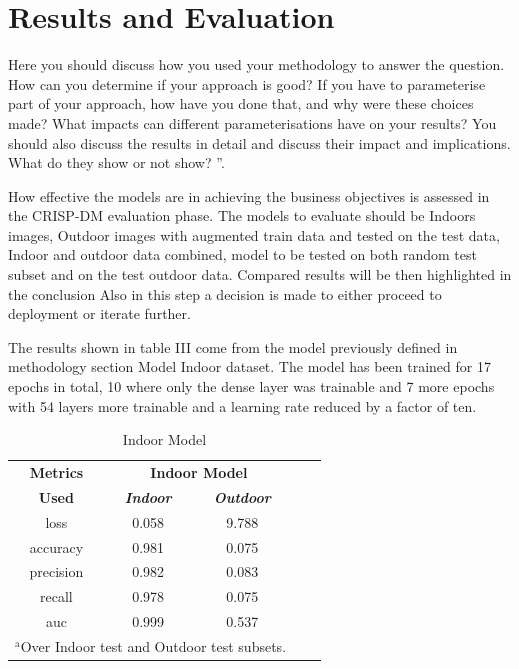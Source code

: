 \documentclass[conference]{IEEEtran}
\begin{document}
\section{Results and Evaluation}
Here you should discuss how you used your methodology to answer the question.  How can you determine if your approach is good?  If you have to parameterise part of your approach, how have you done that, and why were these choices made?  What impacts can different parameterisations have  on  your  results?   You  should  also  discuss  the  results  in  detail  and discuss their impact and implications.  What do they show or not show? ”. \

How effective the models are in achieving the business objectives is assessed in the CRISP-DM evaluation phase. The models to evaluate should be Indoors images, Outdoor images with augmented train data and tested on the test data, Indoor and outdoor data combined, model to be tested on both random test subset and on the test outdoor data. Compared results will be then highlighted in the conclusion 
Also in this step a decision is made to either proceed to deployment or iterate further. 

The results shown in table III come from the model previously defined in methodology section Model Indoor dataset.  The model has been trained for 17 epochs in total, 10 where only the dense layer was trainable and 7 more epochs with 54 layers more trainable and a learning rate reduced by a factor of ten.  

\begin{table}[htbp]
\caption{Indoor Model}
\begin{center}
\begin{tabular}{|c|c|c|c|c|}
\hline
\textbf{Metrics}&\multicolumn{2}{|c|}{\textbf{Indoor Model}} \\
\cline{2-3} 
\textbf{Used} & \textbf{\textit{Indoor}}& \textbf{\textit{Outdoor}} \\
\hline
loss &0.058&9.788  \\
\hline
accuracy &0.981&0.075 \\
\hline
precision &0.982&0.083 \\
\hline
recall &0.978&0.075 \\
\hline
auc &0.999&0.537  \\
\hline
\multicolumn{3}{l}{$^{\mathrm{a}}$Over Indoor test and Outdoor test subsets.}
\end{tabular}
\label{tab1}
\end{center}
\end{table}
\end{document}
